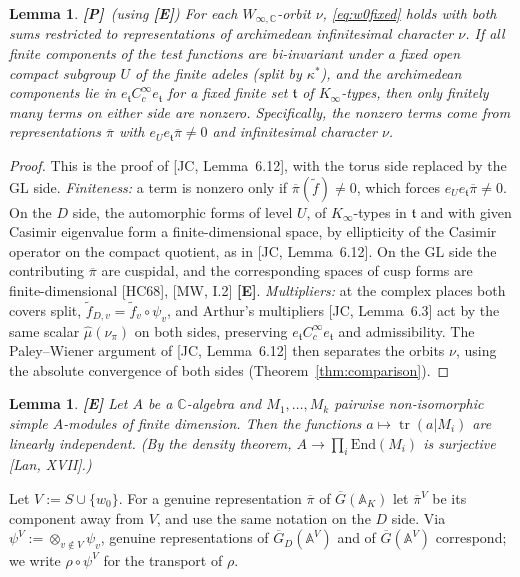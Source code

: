 \documentclass[12pt]{article}
\newcommand{\ov}[1]{\overline{#1}}
\newcommand{\A}{\mathbb{A}}
\newcommand{\C}{\mathbb{C}}
\newcommand{\tr}{\operatorname{tr}}
\newcommand{\GL}{\mathrm{GL}}
\newcommand{\Gb}{\ov{G}}
\newcommand{\GDb}{\ov{G}_D}
\newcommand{\pib}{\ov{\pi}}
\newcommand{\ks}{\kappa^{*}}
\newcommand{\Pv}{\textbf{[P]}}
\newcommand{\Ev}{\textbf{[E]}}
\theoremstyle{plain}
\newtheorem{lemma}[theorem]{Lemma}
\theoremstyle{definition}
\begin{document}
\begin{lemma}\label{lem:nusep}\Pv\ (using \Ev)
For each $W_{\infty,\C}$-orbit $\nu$, \eqref{eq:w0fixed} holds with both sums restricted to representations of archimedean infinitesimal character $\nu$. If all finite components of the test functions are bi-invariant under a fixed open compact subgroup $U$ of the finite adeles (split by $\ks$), and the archimedean components lie in $e_{\mathfrak t}C_c^\infty e_{\mathfrak t}$ for a fixed finite set $\mathfrak t$ of $K_\infty$-types, then only finitely many terms on either side are nonzero. Specifically, the nonzero terms come from representations $\pib$ with $e_Ue_{\mathfrak t}\pib\neq0$ and infinitesimal character $\nu$.
\end{lemma}
\begin{proof}
This is the proof of [JC, Lemma~6.12], with the torus side replaced by the $\GL$ side. \emph{Finiteness:} a term is nonzero only if $\pib(\tilde f)\neq0$, which forces $e_Ue_{\mathfrak t}\pib\neq0$. On the $D$ side, the automorphic forms of level $U$, of $K_\infty$-types in $\mathfrak t$ and with given Casimir eigenvalue form a finite-dimensional space, by ellipticity of the Casimir operator on the compact quotient, as in [JC, Lemma~6.12]. On the $\GL$ side the contributing $\pib$ are cuspidal, and the corresponding spaces of cusp forms are finite-dimensional [HC68], [MW, I.2] \Ev. \emph{Multipliers:} at the complex places both covers split, $\tilde f_{D,v}=\tilde f_v\circ\psi_v$, and Arthur's multipliers [JC, Lemma~6.3] act by the same scalar $\hat\mu(\nu_\pi)$ on both sides, preserving $e_{\mathfrak t}C_c^\infty e_{\mathfrak t}$ and admissibility. The Paley--Wiener argument of [JC, Lemma~6.12] then separates the orbits $\nu$, using the absolute convergence of both sides (Theorem~\ref{thm:comparison}).
\end{proof}

\begin{lemma}\label{lem:linind}\Ev
Let $A$ be a $\C$-algebra and $M_1,\dots,M_k$ pairwise non-isomorphic simple $A$-modules of finite dimension. Then the functions $a\mapsto\tr(a|M_i)$ are linearly independent. (By the density theorem, $A\to\prod_i\mathrm{End}(M_i)$ is surjective [Lan, XVII].)
\end{lemma}

Let $V:=S\cup\{w_0\}$. For a genuine representation $\pib$ of $\Gb(\A_K)$ let $\pib^V$ be its component away from $V$, and use the same notation on the $D$ side. Via $\psi^V:=\otimes_{v\notin V}\psi_v$, genuine representations of $\GDb(\A^V)$ and of $\Gb(\A^V)$ correspond; we write $\rho\circ\psi^V$ for the transport of $\rho$.
\end{document}
